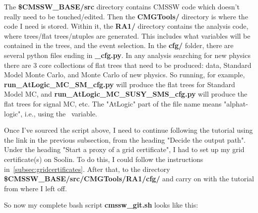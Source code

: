 The \textbf{\$CMSSW\_BASE/src} directory contains CMSSW code which doesn't really need to be touched/edited. Then the \textbf{CMGTools/} directory is where the code I need is stored. Within it, the \textbf{RA1/} directory contains the analysis code, where trees/flat trees/ntuples are generated. This includes what variables will be contained in the trees, and the event selection. In the \textbf{cfg/} folder, there are several python files ending in \textbf{\_cfg.py}. In any analysis searching for new physics there are 3 core collections of flat trees that need to be produced: data, Standard Model Monte Carlo, and Monte Carlo of new physics. So running, for example, \textbf{run\_AtLogic\_MC\_SM\_cfg.py} will produce the flat trees for Standard Model MC, and \textbf{run\_AtLogic\_MC\_SUSY\_SMS\_cfg.py} will produce the flat trees for signal MC, etc. The "AtLogic" part of the file name means "alphat-logic", i.e., using the \alphat\ variable.

Once I've sourced the script above, I need to continue following the tutorial using the link in the previous subsection, from the heading "Decide the output path". Under the heading "Start a proxy of a grid certificate", I had to set up my grid certificate(s) on Soolin. To do this, I could follow the instructions in~\ref{subsec:gridcertificates}. After that, to the directory \textbf{\$CMSSW\_\-BASE/src/CMGTools/RA1/cfg/} and carry on with the tutorial from where I left off.


So now my complete bash script \textbf{cmssw\_git.sh} looks like this:



